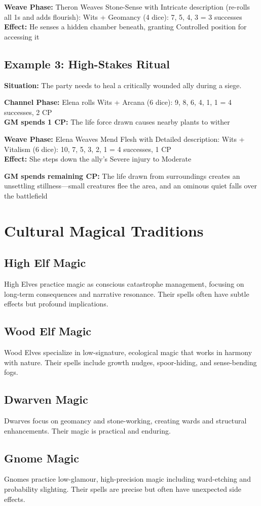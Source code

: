 \documentclass[11pt]{report}
\begin{document}
\textbf{Weave Phase:} Theron Weaves Stone-Sense with Intricate description (re-rolls all 1s and adds flourish): Wits + Geomancy (4 dice): 7, 5, 4, 3 = 3 successes\\
\textbf{Effect:} He senses a hidden chamber beneath, granting Controlled position for accessing it

\subsection{Example 3: High-Stakes Ritual}
\textbf{Situation:} The party needs to heal a critically wounded ally during a siege.

\textbf{Channel Phase:} Elena rolls Wits + Arcana (6 dice): 9, 8, 6, 4, 1, 1 = 4 successes, 2 CP\\
\textbf{GM spends 1 CP:} The life force drawn causes nearby plants to wither

\textbf{Weave Phase:} Elena Weaves Mend Flesh with Detailed description: Wits + Vitalism (6 dice): 10, 7, 5, 3, 2, 1 = 4 successes, 1 CP\\
\textbf{Effect:} She steps down the ally's Severe injury to Moderate

\textbf{GM spends remaining CP:} The life drawn from surroundings creates an unsettling stillness—small creatures flee the area, and an ominous quiet falls over the battlefield

\section{Cultural Magical Traditions}

\subsection{High Elf Magic}
High Elves practice magic as conscious catastrophe management, focusing on long-term consequences and narrative resonance. Their spells often have subtle effects but profound implications.

\subsection{Wood Elf Magic}
Wood Elves specialize in low-signature, ecological magic that works in harmony with nature. Their spells include growth nudges, spoor-hiding, and sense-bending fogs.

\subsection{Dwarven Magic}
Dwarves focus on geomancy and stone-working, creating wards and structural enhancements. Their magic is practical and enduring.

\subsection{Gnome Magic}
Gnomes practice low-glamour, high-precision magic including ward-etching and probability slighting. Their spells are precise but often have unexpected side effects.
\end{document}
